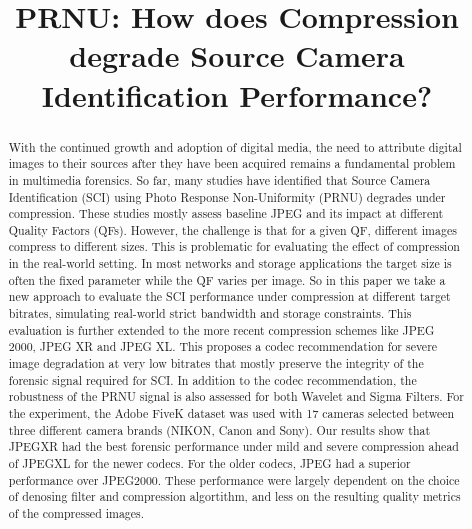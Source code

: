 \documentclass[conference]{IEEEtran}
\begin{document}
\title{PRNU: How does Compression degrade Source Camera Identification Performance?
}

\author{
}

\maketitle

\begin{abstract}
With the continued growth and adoption of digital media, the need to attribute digital images to
their sources after they have been acquired remains a fundamental problem in multimedia forensics.
So far, many studies have identified that Source Camera Identification (SCI) using 
Photo Response Non-Uniformity (PRNU) degrades under compression. These studies mostly assess baseline 
JPEG and its impact at different Quality Factors (QFs). However, the challenge is that for a given QF, different images 
compress to different sizes. This is problematic for evaluating the effect of compression in the real-world setting.
In most networks and storage applications the target size is often the fixed parameter while the QF varies per image. 
So in this paper we take a new approach to evaluate the SCI performance under compression at different target bitrates,
simulating real-world strict bandwidth and storage constraints. 
This evaluation is further extended to the more recent compression schemes like JPEG 2000, JPEG XR and JPEG XL.
This proposes a codec recommendation for severe image degradation at very low bitrates that mostly 
preserve the integrity of the forensic signal required for SCI. In addition to the codec recommendation, the robustness
of the PRNU signal is also assessed for both Wavelet and Sigma Filters. For the experiment, the Adobe FiveK dataset 
was used with 17 cameras selected between three different camera brands (NIKON, Canon and Sony). Our results show that JPEGXR had the best forensic performance under mild and severe compression ahead of JPEGXL for the newer codecs. For the older codecs, JPEG had a superior performance over JPEG2000. These performance were largely dependent on the choice of denosing filter and compression algortithm, and less on the resulting quality metrics of the compressed images.   
\end{abstract}
\end{document}

